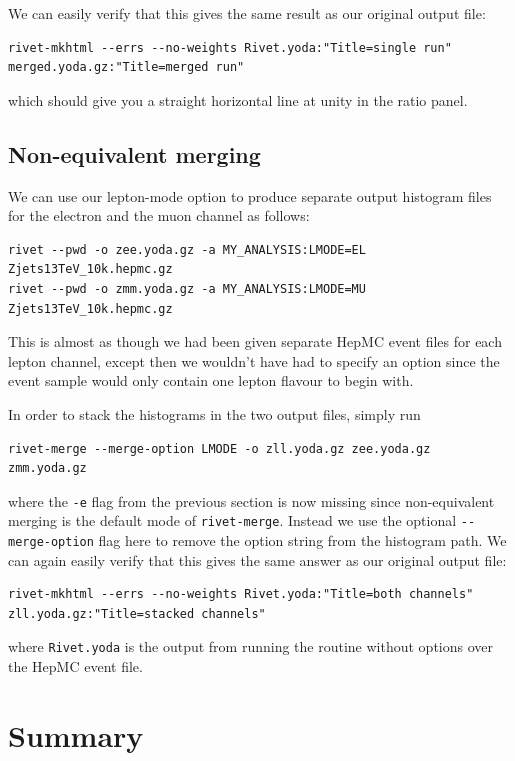 \documentclass[10pt,fleqn]{scrartcl}
\theoremstyle{exstyle}
\begin{document}
We can easily verify that this gives the same result as our original output file:
\begin{footnotesize}
\begin{verbatim}
rivet-mkhtml --errs --no-weights Rivet.yoda:"Title=single run" merged.yoda.gz:"Title=merged run"
\end{verbatim}
\end{footnotesize}
which should give you a straight horizontal line at unity in the ratio panel.


\subsection{Non-equivalent merging}

We can use our lepton-mode option to produce separate output histogram files 
for the electron and the muon channel as follows:
\begin{verbatim}
rivet --pwd -o zee.yoda.gz -a MY_ANALYSIS:LMODE=EL Zjets13TeV_10k.hepmc.gz
rivet --pwd -o zmm.yoda.gz -a MY_ANALYSIS:LMODE=MU Zjets13TeV_10k.hepmc.gz
\end{verbatim}
This is almost as though we had been given separate HepMC event files for
each lepton channel, except then we wouldn't have had to specify an option
since the event sample would only contain one lepton flavour to begin with.

In order to stack the histograms in the two output files, simply run
\begin{verbatim}
rivet-merge --merge-option LMODE -o zll.yoda.gz zee.yoda.gz zmm.yoda.gz
\end{verbatim}
where the \verb|-e| flag from the previous section is now missing 
since non-equivalent merging is the default mode of \texttt{rivet-merge}.
Instead we use the optional \verb|--merge-option| flag here to remove the 
option string from the histogram path. We can again easily verify that 
this gives the same answer as our original output file:
\begin{footnotesize}
\begin{verbatim}
rivet-mkhtml --errs --no-weights Rivet.yoda:"Title=both channels" zll.yoda.gz:"Title=stacked channels"
\end{verbatim}
\end{footnotesize}
where \verb|Rivet.yoda| is the output from running the routine without options
over the HepMC event file.



\section{Summary}
\end{document}
